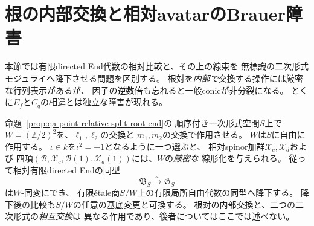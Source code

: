 
\section{根の内部交換と相対avatarのBrauer障害}
\label{sec:qa-root-descent-brauer}

本節では有限directed End代数の相対比較と、その上の線束を
無標識の二次形式モジュライへ降下させる問題を区別する。
根対を\emph{内部で}交換する操作には厳密な行列表示があるが、
因子の逆数倍も忘れると一般conicが非分裂になる。
とくに$E_f$と$C_q$の相違とは独立な障害が現れる。

\begin{proposition}[二つの根対の内部交換による厳密な有限End降下]
\label{prop:qa-root-swaps-linearization}
命題~\ref{prop:qa-point-relative-split-root-end}の
順序付き一次形式空間$S$上で
$W=(\mathbb Z/2)^2$を、$\ell_1,\ell_2$の交換と
$m_1,m_2$の交換で作用させる。
$W$は$S$に自由に作用する。
$\iota\in k$を$\iota^2=-1$となるように一つ選ぶと、
相対spinor加群$\mathcal X_c,\mathcal X_d$および
四項$(\mathcal B,\mathcal X_c,\mathcal B(1),
\mathcal X_d(1))$には、$W$の\emph{厳密な}
線形化を与えられる。
従って相対有限directed Endの同型
\[
 \mathfrak B_S\xrightarrow{\sim}\mathfrak G_S
\]
は$W$-同変にでき、
有限\'{e}tale商$S/W$上の有限局所自由代数の同型へ降下する。
降下後の比較も$S/W$の任意の基底変更と可換する。
根対の内部交換と、二つの二次形式の\emph{相互交換}は
異なる作用であり、後者についてはここでは述べない。
\end{proposition}

